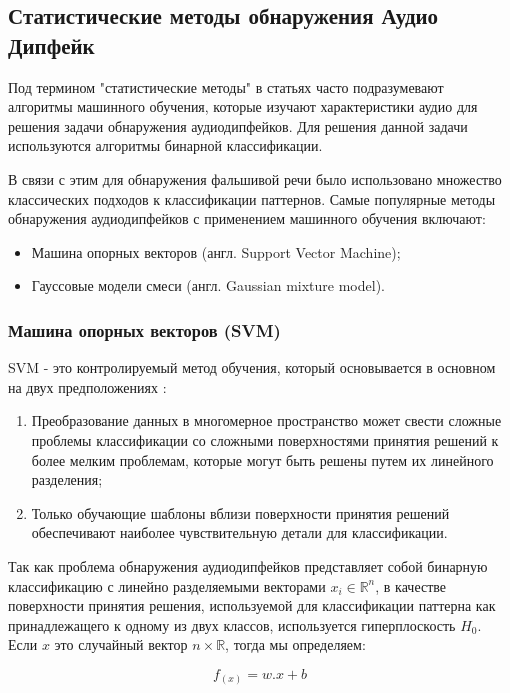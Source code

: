 \subsection{Статистические методы обнаружения Аудио Дипфейк}

Под термином "статистические методы" в статьях часто подразумевают алгоритмы машинного обучения, которые изучают характеристики аудио для решения задачи обнаружения аудиодипфейков. Для решения данной задачи используются алгоритмы бинарной классификации.

В связи с этим для обнаружения фальшивой речи было использовано множество классических подходов к классификации паттернов. Самые популярные методы обнаружения аудиодипфейков с применением машинного обучения включают:

\begin{itemize}
    \item Машина опорных векторов (англ. Support Vector Machine);
    \item Гауссовые модели смеси (англ. Gaussian mixture model).
\end{itemize}

\subsubsection{Машина опорных векторов (SVM)}

SVM - это контролируемый метод обучения, который основывается в основном на двух предположениях \cite{hamza2022deepfake}:
\begin{enumerate}
    \item Преобразование данных в многомерное пространство может свести сложные проблемы классификации со сложными поверхностями принятия решений к более мелким проблемам, которые могут быть решены путем их линейного разделения;
    \item Только обучающие шаблоны вблизи поверхности принятия решений обеспечивают наиболее чувствительную детали для классификации.
\end{enumerate}

Так как проблема обнаружения аудиодипфейков представляет собой бинарную классификацию с линейно разделяемыми векторами \(x_{i} \in \mathbb{R}^{n}\), в качестве поверхности принятия решения, используемой для классификации паттерна как принадлежащего к одному из двух классов, используется гиперплоскость \(H_{0}\). Если \(x\) это случайный вектор \(n \times \mathbb{R}\), тогда мы определяем:

\[
    f_{(x)} = w.x + b
\]

